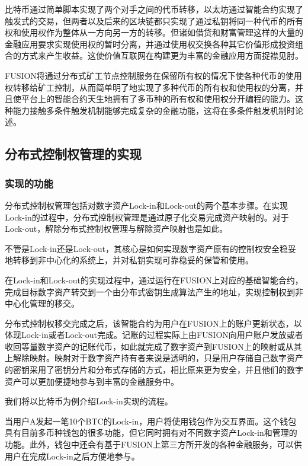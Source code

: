 \documentclass[a4paper,12pt]{article}
\begin{document}
比特币通过简单脚本实现了两个对手之间的代币转移，以太坊通过智能合约实现了触发式的交易，但两者以及后来的区块链都只实现了通过私钥将同一种代币的所有权和使用权作为整体从一方向另一方的转移。但诸如借贷和财富管理这样的大量的金融应用要求实现使用权的暂时分离，并通过使用权交换各种其它价值形成投资组合的方式来产生收益。这使价值互联网在构建更为丰富的金融应用方面捉襟见肘。

FUSION将通过分布式矿工节点控制服务在保留所有权的情况下使各种代币的使用权转移给矿工控制，从而简单明了地实现了多种代币的所有权和使用权的分离，并且使平台上的智能合约天生地拥有了多币种的所有权和使用权分开编程的能力。这种能力接触多条件触发机制能够完成复杂的金融功能，这将在多条件触发机制时论述。

\subsection{分布式控制权管理的实现}

\subsubsection{实现的功能}

分布式控制权管理包括对数字资产Lock-in和Lock-out的两个基本步骤。在实现Lock-in的过程中，分布式控制权管理是通过原子化交易完成资产映射的。对于Lock-out，解除分布式控制权管理与解除资产映射也是如此。

不管是Lock-in还是Lock-out，其核心是如何实现数字资产原有的控制权安全稳妥地转移到非中心化的系统上，并对私钥实现可靠稳妥的保管和使用。

在Lock-in和Lock-out的实现过程中，通过运行在FUSION上对应的基础智能合约，完成目标数字资产转交到一个由分布式密钥生成算法产生的地址，实现控制权到非中心化管理的移交。

分布式控制权移交完成之后，该智能合约为用户在FUSION上的账户更新状态，以体现Lock-in或者Lock-out完成。记账的过程实际上由FUSION向用户账户发放或者收回等量数字资产的记账代币，如此就完成了数字资产到FUSION上的映射或从其上解除映射。映射对于数字资产持有者来说是透明的，只是用户存储自己数字资产的密钥采用了密钥分片和分布式存储的方式，相比原来更为安全，并且他们的数字资产可以更加便捷地参与到丰富的金融服务中。

我们将以比特币为例介绍Lock-in实现的流程。

当用户A发起一笔10个BTC的Lock-in，用户将使用钱包作为交互界面。这个钱包具有目前多币种钱包的很多功能，但它同时拥有对不同数字资产Lock-in和管理的功能。此外，钱包中还会有基于FUSION上第三方所开发的各种金融服务，可以供用户在完成Lock-in之后方便地参与。
\end{document}
